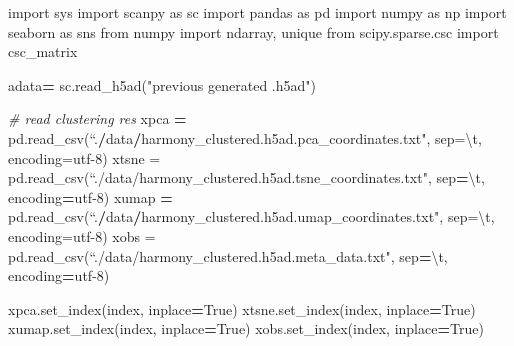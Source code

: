 \documentclass[
]{article}
\newenvironment{Shaded}{\begin{snugshade}}{\end{snugshade}}
\newcommand{\CharTok}[1]{\textcolor[rgb]{0.31,0.60,0.02}{#1}}
\newcommand{\CommentTok}[1]{\textcolor[rgb]{0.56,0.35,0.01}{\textit{#1}}}
\newcommand{\ImportTok}[1]{#1}
\newcommand{\NormalTok}[1]{#1}
\newcommand{\OperatorTok}[1]{\textcolor[rgb]{0.81,0.36,0.00}{\textbf{#1}}}
\newcommand{\StringTok}[1]{\textcolor[rgb]{0.31,0.60,0.02}{#1}}
\newcommand{\VariableTok}[1]{\textcolor[rgb]{0.00,0.00,0.00}{#1}}
\begin{document}
\begin{Shaded}
\begin{Highlighting}[]
\ImportTok{import}\NormalTok{ sys}
\ImportTok{import}\NormalTok{ scanpy }\ImportTok{as}\NormalTok{ sc}
\ImportTok{import}\NormalTok{ pandas }\ImportTok{as}\NormalTok{ pd}
\ImportTok{import}\NormalTok{ numpy }\ImportTok{as}\NormalTok{ np}
\ImportTok{import}\NormalTok{ seaborn }\ImportTok{as}\NormalTok{ sns}
\ImportTok{from}\NormalTok{ numpy }\ImportTok{import}\NormalTok{ ndarray, unique}
\ImportTok{from}\NormalTok{ scipy.sparse.csc }\ImportTok{import}\NormalTok{ csc\_matrix}

\NormalTok{adata}\OperatorTok{=}\NormalTok{ sc.read\_h5ad(}\StringTok{"previous generated .h5ad"}\NormalTok{)}

\CommentTok{\# read clustering res}
\NormalTok{xpca }\OperatorTok{=}\NormalTok{ pd.read\_csv(“.}\OperatorTok{/}\NormalTok{data}\OperatorTok{/}\NormalTok{harmony\_clustered.h5ad.pca\_coordinates.txt}\StringTok{", sep=\textquotesingle{}}\CharTok{\textbackslash{}t}\StringTok{\textquotesingle{}, encoding=\textquotesingle{}utf{-}8\textquotesingle{})}
\StringTok{xtsne = pd.read\_csv(“./data/harmony\_clustered.h5ad.tsne\_coordinates.txt"}\NormalTok{, sep}\OperatorTok{=}\StringTok{\textquotesingle{}}\CharTok{\textbackslash{}t}\StringTok{\textquotesingle{}}\NormalTok{, encoding}\OperatorTok{=}\StringTok{\textquotesingle{}utf{-}8\textquotesingle{}}\NormalTok{)}
\NormalTok{xumap }\OperatorTok{=}\NormalTok{ pd.read\_csv(“.}\OperatorTok{/}\NormalTok{data}\OperatorTok{/}\NormalTok{harmony\_clustered.h5ad.umap\_coordinates.txt}\StringTok{", sep=\textquotesingle{}}\CharTok{\textbackslash{}t}\StringTok{\textquotesingle{}, encoding=\textquotesingle{}utf{-}8\textquotesingle{})}
\StringTok{xobs = pd.read\_csv(“./data/harmony\_clustered.h5ad.meta\_data.txt"}\NormalTok{, sep}\OperatorTok{=}\StringTok{\textquotesingle{}}\CharTok{\textbackslash{}t}\StringTok{\textquotesingle{}}\NormalTok{, encoding}\OperatorTok{=}\StringTok{\textquotesingle{}utf{-}8\textquotesingle{}}\NormalTok{)}

\NormalTok{xpca.set\_index(}\StringTok{\textquotesingle{}index\textquotesingle{}}\NormalTok{, inplace}\OperatorTok{=}\VariableTok{True}\NormalTok{)}
\NormalTok{xtsne.set\_index(}\StringTok{\textquotesingle{}index\textquotesingle{}}\NormalTok{, inplace}\OperatorTok{=}\VariableTok{True}\NormalTok{)}
\NormalTok{xumap.set\_index(}\StringTok{\textquotesingle{}index\textquotesingle{}}\NormalTok{, inplace}\OperatorTok{=}\VariableTok{True}\NormalTok{)}
\NormalTok{xobs.set\_index(}\StringTok{\textquotesingle{}index\textquotesingle{}}\NormalTok{, inplace}\OperatorTok{=}\VariableTok{True}\NormalTok{)}


\end{Highlighting}
\end{Shaded}
\end{document}
